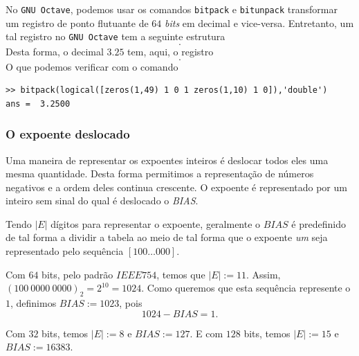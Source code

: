\ifisoctave
\begin{obs}
  No \verb+GNU Octave+, podemos usar os comandos \verb+bitpack+ e \verb+bitunpack+ transformar um registro de ponto flutuante de $64$ \emph{bits} em decimal e vice-versa. Entretanto, um tal registro no \verb+GNU Octave+ tem a seguinte estrutura
  \begin{equation}
    [m_{52}m_{51}m_{50}\ldots m_{1}|c_0c_1c_2\cdots c_{10}|s].
  \end{equation}
Desta forma, o decimal $3.25$ tem, aqui, o registro
\begin{equation}
  [000\ldots 0101|000\ldots 01|0].
\end{equation}
O que podemos verificar com o comando
\begin{verbatim}
>> bitpack(logical([zeros(1,49) 1 0 1 zeros(1,10) 1 0]),'double')
ans =  3.2500
\end{verbatim}
\end{obs}
\fi

\subsubsection{O expoente deslocado}

Uma maneira de representar os expoentes inteiros é deslocar todos eles uma mesma quantidade. Desta forma permitimos a representação de números negativos e a ordem deles continua crescente. O expoente é representado por um inteiro sem sinal do qual é deslocado o \emph{BIAS}.

Tendo $|E|$ dígitos para representar o expoente, geralmente o $BIAS$ é predefinido de tal forma a dividir a tabela ao meio de tal forma que o expoente \textit{um} seja representado pelo sequência $[100\ldots 000]$.

\begin{ex}
  Com $64$ bits, pelo padrão $IEEE754$, temos que $|E|:=11$. Assim, $(100~0000~0000)_2=2^{10}=1024$. Como queremos que esta sequência represente o $1$, definimos $BIAS:=1023$, pois
  \begin{equation}  1024-BIAS=1. \end{equation}

  Com $32$ bits, temos $|E|:=8$ e $BIAS:=127$. E com $128$ bits, temos $|E|:=15$ e $BIAS:=16383$.
\end{ex}

